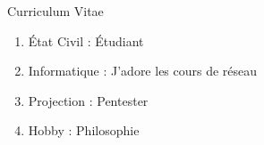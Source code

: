 \begin{frame}{Curriculum Vitae}
    \protect\hypertarget{curriculum-vitae}{}
    
    \begin{enumerate}
    \tightlist
    \item
      État Civil : Étudiant
    \item
      Informatique : J'adore les cours de réseau
    \item
      Projection : Pentester
    \item
      Hobby : Philosophie
    \end{enumerate}
    
\end{frame}